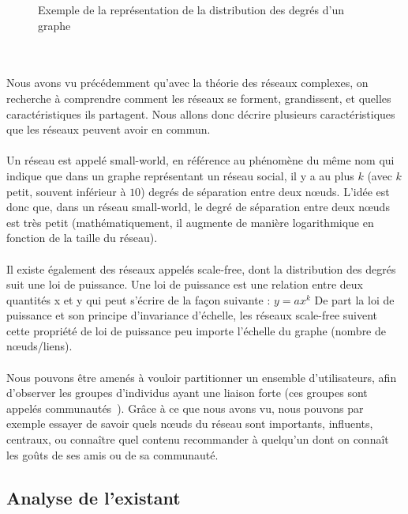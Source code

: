 \begin{titlepage}
{\begin{figure}[h]
\caption{Exemple de la représentation de la distribution des degrés d'un graphe}
\end{figure}
\\ \\ 
Nous avons vu précédemment qu'avec la théorie des réseaux complexes, on recherche à comprendre comment les réseaux se forment, grandissent, et quelles caractéristiques ils partagent. Nous allons donc décrire plusieurs caractéristiques que les réseaux peuvent avoir en commun.
\\ \\ 
Un réseau est appelé small-world, en référence au phénomène du même nom qui indique que dans un graphe représentant un réseau social, il y a au plus $k$ (avec $k$ petit, souvent inférieur à $10$) degrés de séparation entre deux nœuds. L'idée est donc que, dans un réseau small-world, le degré de séparation entre deux nœuds est très petit (mathématiquement, il augmente de manière logarithmique en fonction de la taille du réseau).
\\ \\ 
Il existe également des réseaux appelés scale-free, dont la distribution des degrés suit une loi de puissance. Une loi de puissance est une relation entre deux quantités x et y qui peut s'écrire de la façon suivante :
$ y = ax^k $
De part la loi de puissance et son principe d'invariance d'échelle, les réseaux scale-free suivent cette propriété de loi de puissance peu importe l'échelle du graphe (nombre de nœuds/liens).
\\ \\ 
Nous pouvons être amenés à vouloir partitionner un ensemble d'utilisateurs, afin d'observer les groupes d'individus ayant une liaison forte (ces groupes sont appelés communautés~\cite{communautes, structure}). Grâce à ce que nous avons vu, nous pouvons par exemple essayer de savoir quels nœuds du réseau sont importants, influents, centraux, ou connaître quel contenu recommander à quelqu'un dont on connaît les goûts de ses amis ou de sa communauté.
}


\newpage
\begin{center}
\begin{bf}
\section{Analyse de l'existant}
\end{bf}
\end{center}


\end{titlepage}
